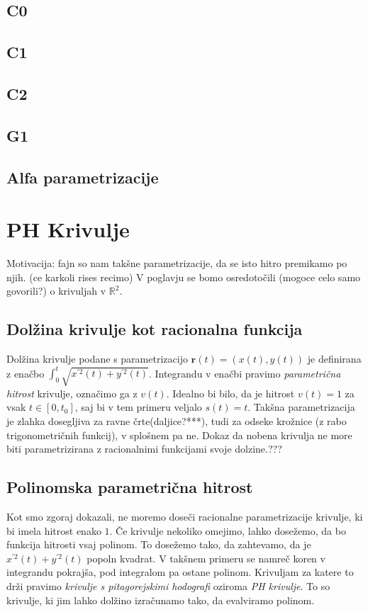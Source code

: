 \documentclass[isrm2, tisk]{fmfdelo}
\newcommand{\R}{\mathbb R}
\begin{document}
    \subsection{C0}

    \subsection{C1}

    \subsection{C2}

    \subsection{G1}

    \subsection{Alfa parametrizacije}


    \section{PH Krivulje}
    Motivacija: fajn so nam takšne parametrizacije, da se isto hitro premikamo po njih. (ce karkoli rises recimo)
    V poglavju se bomo osredotočili (mogoce celo samo govorili?) o krivuljah v $\R^2$.

    \subsection{Dolžina krivulje kot racionalna funkcija}
    Dolžina krivulje podane s parametrizacijo  $\mathbf{r}(t) = \left(x(t),y(t)\right)$ je definirana z enačbo $\int_0^t \sqrt {x^{'2}(t)+y^{'2}(t)}$.
    Integrandu v enačbi pravimo \textit{parametrična hitrost} krivulje, označimo ga z $v(t)$.
    Idealno bi bilo, da je hitrost $v(t) = 1$ za vsak $t\in [0,t_0]$, saj bi v tem primeru veljalo $s(t)=t$.
    Takšna parametrizacija je zlahka dosegljiva za ravne črte(daljice?***), tudi za odseke krožnice (z rabo trigonometričnih funkcij), v splošnem pa ne.
    Dokaz da nobena krivulja ne more biti parametrizirana z racionalnimi funkcijami svoje dolzine.???

    \subsection{Polinomska parametrična hitrost}
    Kot smo zgoraj dokazali, ne moremo doseči racionalne parametrizacije krivulje, ki bi imela hitrost enako $1$.
    Če krivulje nekoliko omejimo, lahko dosežemo, da bo funkcija hitrosti vsaj polinom.
    To dosežemo tako, da zahtevamo, da je $x^{'2}(t)+y^{'2}(t)$ popoln kvadrat.
    V takšnem primeru se namreč koren v integrandu pokrajša, pod integralom pa ostane polinom.
    Krivuljam za katere to drži pravimo \textit{krivulje s pitagorejskimi hodografi} oziroma \textit{PH krivulje}.
    To so krivulje, ki jim lahko dolžino izračunamo tako, da evalviramo polinom.
\end{document}
